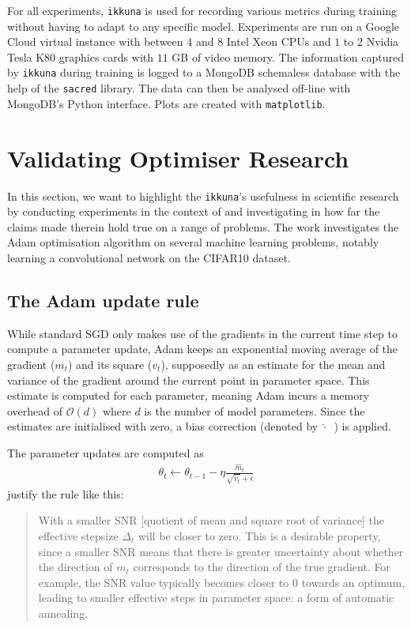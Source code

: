For all experiments, \texttt{ikkuna} is used for recording various metrics
during training without having to adapt to any specific model. Experiments are
run on a Google Cloud virtual instance with between $4$ and $8$ Intel Xeon CPUs
and $1$ to $2$  Nvidia Tesla K80 graphics cards with $11$ GB of video memory. The
information captured by \texttt{ikkuna} during training is logged to a MongoDB
schemaless database with the help of the \texttt{sacred} library. The data can
then be analysed off-line with MongoDB's Python interface. Plots are created
with \texttt{matplotlib}. %

\section{Validating Optimiser Research}%
\label{sec:adam}

In this section, we want to highlight the \texttt{ikkuna}'s usefulness in
scientific research by conducting experiments in the context of
\citep{kingma2014adam} and investigating in how far the claims made therein hold
true on a range of problems. The work investigates the Adam optimisation
algorithm on several machine learning problems, notably learning a convolutional
network on the CIFAR10 dataset.

\subsection{The Adam update rule}%
\label{sub:the_adam_update_rule}

While standard SGD only makes use of the gradients in the current time step to
compute a parameter update, Adam keeps an exponential moving average of the
gradient ($m_t$) and its square ($v_t$), supposedly as an estimate for the mean
and variance of the gradient around the current point in parameter space. This
estimate is computed for each parameter, meaning Adam incurs a memory overhead
of $\mathcal{O}(d)$ where $d$ is the number of model parameters. Since the
estimates are initialised with zero, a bias correction (denoted by
$\widehat{\cdot}$~) is applied.

The parameter updates are computed as
\begin{align}
    \theta_t \leftarrow \theta_{t-1}  - \eta \frac{\widehat{m}_t}{\sqrt{\widehat{v}_t} +
    \epsilon}
    \label{eq:adam}
\end{align}
\citeauthor{kingma2014adam} justify the rule like this:
\begin{quote}
    With a smaller SNR [quotient of mean and square root of variance] the
    effective stepsize $\Delta_t$ will be closer to zero. This is a desirable
    property, since a smaller SNR means that there is greater uncertainty about
    whether the direction of $m_t$ corresponds to the direction of the true
    gradient. For example, the SNR value typically becomes closer to $0$ towards
    an optimum, leading to smaller effective steps in parameter space: a form of
    automatic annealing.
\end{quote}

